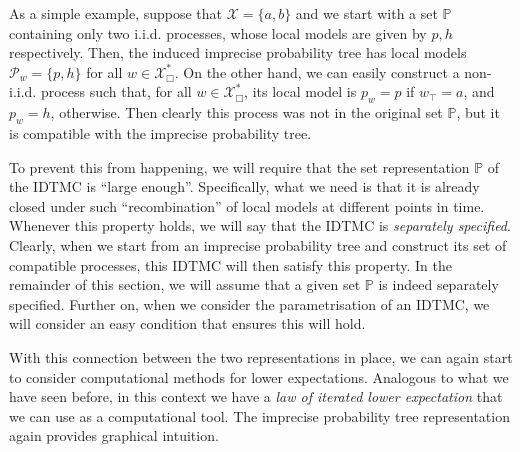 \documentclass[graybox]{svmult}
\newcommand{\states}{\mathcal{X}}
\begin{document}
As a simple example, suppose that $\states=\{a,b\}$ and we start with a set $\mathbb{P}$ containing only two i.i.d. processes, whose local models are given by $p,h$ respectively. Then, the induced imprecise probability tree has local models $\mathcal{P}_w=\{p,h\}$ for all $w\in\states_\Box^*$. On the other hand, we can easily construct a non-i.i.d. process such that, for all $w\in\states_\Box^*$, its local model is $p_w=p$ if $w_\top=a$, and $p_w=h$, otherwise. Then clearly this process was not in the original set $\mathbb{P}$, but it is compatible with the imprecise probability tree. 

To prevent this from happening, we will require that the set representation $\mathbb{P}$ of the IDTMC is ``large enough''. Specifically, what we need is that it is already closed under such ``recombination'' of local models at different points in time. Whenever this property holds, we will say that the IDTMC is \emph{separately specified}. Clearly, when we start from an imprecise probability tree and construct its set of compatible processes, this IDTMC will then satisfy this property. In the remainder of this section, we will assume that a given set $\mathbb{P}$ is indeed separately specified. Further on, when we consider the parametrisation of an IDTMC, we will consider an easy condition that ensures this will hold.

With this connection between the two representations in place, we can again start to consider computational methods for lower expectations. Analogous to what we have seen before, in this context we have a \emph{law of iterated lower expectation} that we can use as a computational tool. The imprecise probability tree representation again provides graphical intuition.
\end{document}
